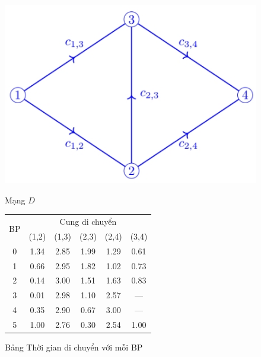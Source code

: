 \documentclass[../main.tex]{subfiles}
\begin{document}
\begin{figure}[H]
\centering
\begin{minipage}[b]{0.45\textwidth}
  \centering
  \includegraphics{edited-images/Figure2.jpg}
  \caption{Mạng \(D\)}
  \label{fig:2}
\end{minipage}
\begin{minipage}[b]{0.45\textwidth}
  \centering
  \begin{small}
      \caption{Bảng Thời gian di chuyển với mỗi BP}
      \label{table:1}
      \begin{tabular}{|c||ccccc|}
      \toprule
      \multirow{2}{*}{BP} & \multicolumn{5}{c|}{Cung di chuyển}                                                                                       \\ \cmidrule{2-6} 
                          & \multicolumn{1}{c|}{(1,2)} & \multicolumn{1}{c|}{(1,3)} & \multicolumn{1}{c|}{(2,3)} & \multicolumn{1}{c|}{(2,4)} & (3,4) \\ \midrule
      0                   & \multicolumn{1}{c|}{1.34}  & \multicolumn{1}{c|}{2.85}  & \multicolumn{1}{c|}{1.99}  & \multicolumn{1}{c|}{1.29}  & 0.61  \\ \midrule
      1                   & \multicolumn{1}{c|}{0.66}  & \multicolumn{1}{c|}{2.95}  & \multicolumn{1}{c|}{1.82}  & \multicolumn{1}{c|}{1.02}  & 0.73  \\ \midrule
      2                   & \multicolumn{1}{c|}{0.14}  & \multicolumn{1}{c|}{3.00}  & \multicolumn{1}{c|}{1.51}  & \multicolumn{1}{c|}{1.63}  & 0.83  \\ \midrule
      3                   & \multicolumn{1}{c|}{0.01}  & \multicolumn{1}{c|}{2.98}  & \multicolumn{1}{c|}{1.10}  & \multicolumn{1}{c|}{2.57}  & ---     \\ \midrule
      4                   & \multicolumn{1}{c|}{0.35}  & \multicolumn{1}{c|}{2.90}  & \multicolumn{1}{c|}{0.67}  & \multicolumn{1}{c|}{3.00}  & ---     \\ \midrule
      5                   & \multicolumn{1}{c|}{1.00}  & \multicolumn{1}{c|}{2.76}  & \multicolumn{1}{c|}{0.30}  & \multicolumn{1}{c|}{2.54}  & 1.00  \\ \bottomrule
      \end{tabular}
  \end{small}
\end{minipage}

\end{figure}
\end{document}
